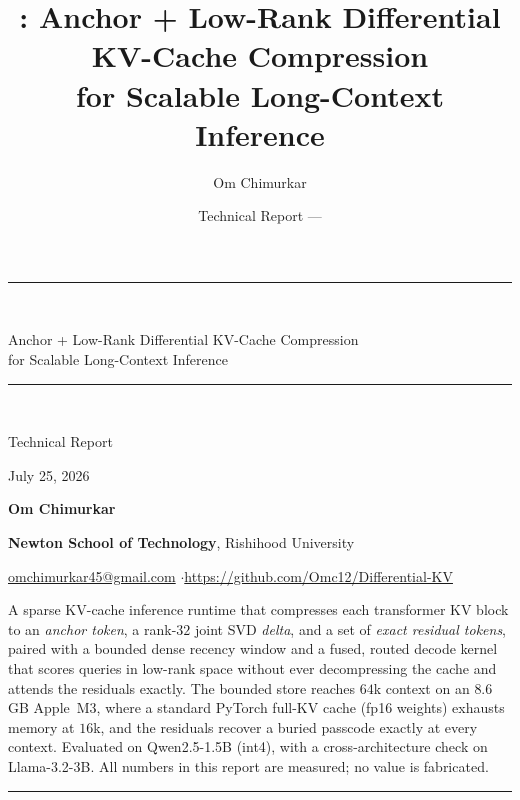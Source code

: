\documentclass[11pt]{article}
\title{\textbf{\dkv{}: Anchor + Low-Rank Differential KV-Cache Compression\\
for Scalable Long-Context Inference}}
\author{Om Chimurkar}
\date{Technical Report --- \pubdate}
\newcommand{\pubdate}{July 25, 2026}
\begin{document}
\begin{titlepage}
\centering
\vspace*{1.2cm}
{\color{ink}\rule{\textwidth}{1.4pt}}\\[0.5cm]
{\Huge\bfseries\color{ink} \dkv{}\par}
\vspace{0.4cm}
{\LARGE Anchor + Low-Rank Differential KV-Cache Compression\\[0.2cm]
for Scalable Long-Context Inference\par}

\vspace{0.5cm}
{\color{accent}\rule{\textwidth}{1.0pt}}\\[0.8cm]
{\large Technical Report\par}
\vspace{0.2cm}
{\large \pubdate\par}
\vspace{0.4cm}
{\large\bfseries Om Chimurkar\par}
\vspace{0.15cm}
{\small\textbf{Newton School of Technology}, Rishihood University\par}
\vspace{0.15cm}
{\small\color{muted}\href{mailto:omchimurkar45@gmail.com}{omchimurkar45@gmail.com} \quad$\cdot$\quad \url{https://github.com/Omc12/Differential-KV}\par}
\vfill
\begin{minipage}{0.86\textwidth}\small\color{muted}\centering
A sparse KV-cache inference runtime that compresses each transformer KV block to an
\emph{anchor token}, a rank-$32$ joint SVD \emph{delta}, and a set of \emph{exact residual
tokens}, paired with a bounded dense recency window and a fused, routed decode kernel that scores
queries in low-rank space without ever decompressing the cache and attends the residuals exactly.
The bounded store reaches $64$k context on an $8.6$\,GB Apple~M3, where a standard PyTorch full-KV
cache (fp16 weights) exhausts memory at $16$k, and the residuals recover a buried passcode exactly at
every context. Evaluated on Qwen2.5-1.5B (int4), with a cross-architecture check on Llama-3.2-3B.
All numbers in this report are measured; no value is fabricated.
\end{minipage}
\vspace{1.2cm}
{\color{ink}\rule{\textwidth}{1.4pt}}
\end{titlepage}


\clearpage
{\hypersetup{linkcolor=ink}
\tableofcontents
\clearpage
\listoffigures
\listoftables
}
\clearpage
















\appendix



\end{document}

